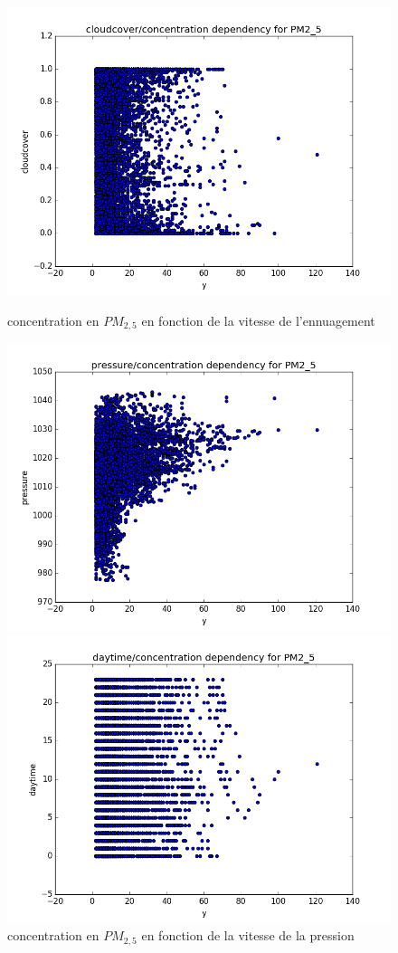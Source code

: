 \begin{figure}[H]
	\captionsetup{labelformat=empty}
	\includegraphics[width=\linewidth]{images/PM2_5_cloud_y.png}
  \caption{concentration en $PM_{2,5}$ en fonction de la vitesse de l'ennuagement}
	\endminipage\hfill
	\includegraphics[width=\linewidth]{images/PM2_5_pressure_y.png}
  \caption{concentration en $PM_{2,5}$ en fonction de la vitesse de la pression}
	\endminipage\hfill
	\includegraphics[width=\linewidth]{images/PM2_5_daytime_y.png}

\end{figure}

